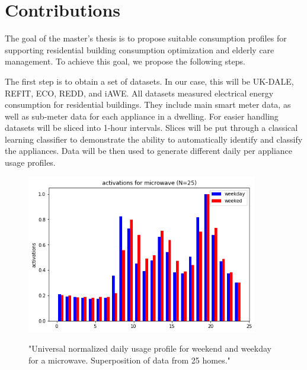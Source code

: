 
\chapter{Contributions} %

\label{Chapter5} %


The goal of the master's thesis is to propose suitable consumption profiles for supporting residential building consumption optimization and elderly care management.
To achieve this goal, we propose the following steps.

The first step is to obtain a set of datasets. In our case, this will be UK-DALE, REFIT, ECO, REDD, and iAWE.
All datasets measured electrical energy consumption for residential buildings. 
They include main smart meter data, as well as sub-meter data for each appliance in a dwelling. 
For easier handling datasets will be sliced into 1-hour intervals. 
Slices will be put through a classical learning classifier to demonstrate the ability to automatically identify and classify the appliances.
Data will be then used to generate different daily per appliance usage profiles.

\begin{figure}[h!]
	\centering
	\caption{"Universal normalized daily usage profile for weekend and weekday for a microwave. Superposition of data from 25 homes."}
	\includegraphics[width=0.9\textwidth]{../Figures/microwave_norm_n25.png}
	\label{fig:UniNormMicrowave}
\end{figure}

